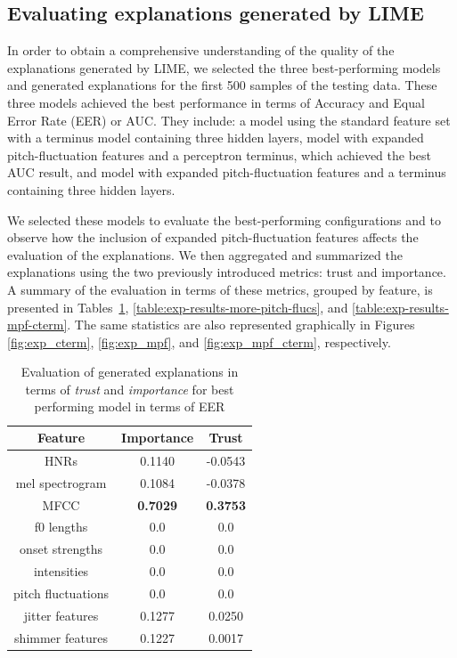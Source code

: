 \documentclass{article}
\begin{document}
            
\subsection{Evaluating explanations generated by LIME} \label{sec:method_metrics}
In order to obtain a comprehensive understanding of the quality of the explanations generated by LIME, we selected the three best-performing models and generated explanations for the first 500 samples of the testing data. These three models achieved the best performance in terms of Accuracy and Equal Error Rate (EER) or AUC. They include: a model using the standard feature set with a terminus model containing three hidden layers, model with expanded pitch-fluctuation features and a perceptron terminus, which achieved the best AUC result, and model with expanded pitch-fluctuation features and a terminus containing three hidden layers.

We selected these models to evaluate the best-performing configurations and to observe how the inclusion of expanded pitch-fluctuation features affects the evaluation of the explanations. We then aggregated and summarized the explanations using the two previously introduced metrics: trust and importance. A summary of the evaluation in terms of these metrics, grouped by feature, is presented in Tables~\ref{table:exp-results-cterm}, \ref{table:exp-results-more-pitch-flucs}, and \ref{table:exp-results-mpf-cterm}. The same statistics are also represented graphically in Figures \ref{fig:exp_cterm}, \ref{fig:exp_mpf}, and \ref{fig:exp_mpf_cterm}, respectively.
\begin{table}[htbp]
	\caption{Evaluation of generated explanations in terms of \textit{trust} and \textit{importance} for best performing model in terms of EER}
			\vspace{10pt}
			\centering
			\begin{tabular}{|c | c | c|}
				\hline
				\textbf{Feature} & \textbf{Importance} & \textbf{Trust} \\
				\hline
				HNRs & 0.1140 & -0.0543 \\  \hline
				mel spectrogram & 0.1084 & -0.0378 \\ \hline
				MFCC & \textbf{0.7029} & \textbf{0.3753} \\ \hline
				f0 lengths & 0.0 & 0.0 \\ \hline
				onset strengths & 0.0 & 0.0 \\ \hline
				intensities & 0.0 & 0.0 \\ \hline
				pitch fluctuations & 0.0 & 0.0 \\ \hline
				jitter features & 0.1277 & 0.0250 \\ \hline
				shimmer features & 0.1227 & 0.0017 \\ \hline
			\end{tabular}
			\label{table:exp-results-cterm}
		\end{table}
		
\end{document}
